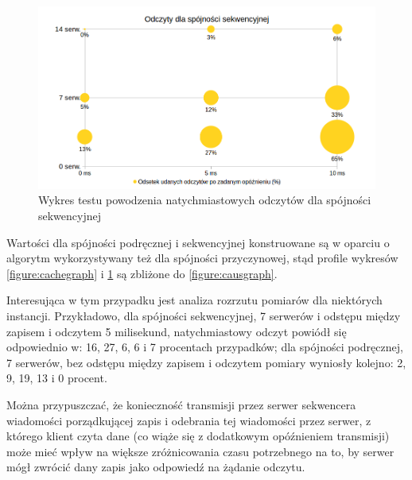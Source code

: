 \begin{figure}[H]
    \includegraphics[width=\linewidth]{images/graphs/seq.png}
    \caption{Wykres testu powodzenia natychmiastowych odczytów dla spójności sekwencyjnej}
    \label{figure:seqgraph}
\end{figure}

Wartości dla spójności podręcznej i sekwencyjnej konstruowane są w oparciu o algorytm wykorzystywany też dla spójności przyczynowej, stąd profile wykresów \ref{figure:cachegraph} i \ref{figure:seqgraph} są zbliżone do \ref{figure:causgraph}.

Interesująca w tym przypadku jest analiza rozrzutu pomiarów dla niektórych instancji. Przykładowo, dla spójności sekwencyjnej, 7 serwerów i odstępu między zapisem i odczytem 5 milisekund, natychmiastowy odczyt powiódł się odpowiednio w: 16, 27, 6, 6 i 7 procentach przypadków; dla spójności podręcznej, 7 serwerów, bez odstępu między zapisem i odczytem pomiary wyniosły kolejno: 2, 9, 19, 13 i 0 procent.

Można przypuszczać, że konieczność transmisji przez serwer sekwencera wiadomości porządkującej zapis i odebrania tej wiadomości przez serwer, z którego klient czyta dane (co wiąże się z dodatkowym opóźnieniem transmisji) może mieć wpływ na większe zróżnicowania czasu potrzebnego na to, by serwer mógł zwrócić dany zapis jako odpowiedź na żądanie odczytu.




